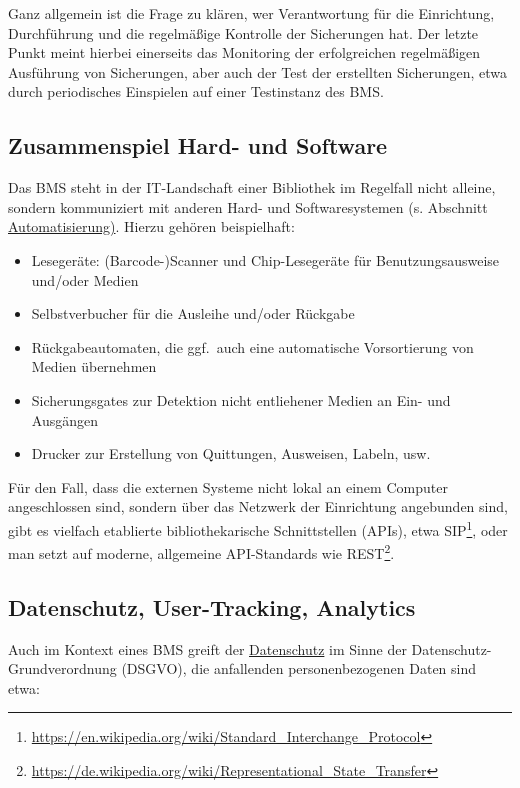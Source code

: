 \documentclass[
  11pt,
  letterpaper,
  DIV=11,
  twoside]{scrreprt}
\DeclareRobustCommand{\href}[2]{#2\footnote{\url{#1}}}
\begin{document}
Ganz allgemein ist die Frage zu klären, wer Verantwortung für die
Einrichtung, Durchführung und die regelmäßige Kontrolle der Sicherungen
hat. Der letzte Punkt meint hierbei einerseits das Monitoring der
erfolgreichen regelmäßigen Ausführung von Sicherungen, aber auch der
Test der erstellten Sicherungen, etwa durch periodisches Einspielen auf
einer Testinstanz des BMS.

\subsection{Zusammenspiel Hard- und
Software}\label{zusammenspiel-hard--und-software}

Das BMS steht in der IT-Landschaft einer Bibliothek im Regelfall nicht
alleine, sondern kommuniziert mit anderen Hard- und Softwaresystemen (s.
Abschnitt
\hyperref[automatisierung-und-selbstbedienung]{Automatisierung)}. Hierzu
gehören beispielhaft:

\begin{itemize}
\item
  Lesegeräte: (Barcode-)Scanner und Chip-Lesegeräte für
  Benutzungsausweise und/oder Medien
\item
  Selbstverbucher für die Ausleihe und/oder Rückgabe
\item
  Rückgabeautomaten, die ggf.~auch eine automatische Vorsortierung von
  Medien übernehmen
\item
  Sicherungsgates zur Detektion nicht entliehener Medien an Ein- und
  Ausgängen
\item
  Drucker zur Erstellung von Quittungen, Ausweisen, Labeln, usw.
\end{itemize}

Für den Fall, dass die externen Systeme nicht lokal an einem Computer
angeschlossen sind, sondern über das Netzwerk der Einrichtung angebunden
sind, gibt es vielfach etablierte bibliothekarische Schnittstellen
(APIs), etwa
\href{https://en.wikipedia.org/wiki/Standard_Interchange_Protocol}{SIP},
oder man setzt auf moderne, allgemeine API-Standards wie
\href{https://de.wikipedia.org/wiki/Representational_State_Transfer}{REST}.

\subsection{Datenschutz, User-Tracking,
Analytics}\label{datenschutz-etc}

Auch im Kontext eines BMS greift der \hyperref[datenschutz]{Datenschutz}
im Sinne der Datenschutz-Grundverordnung (DSGVO), die anfallenden
personenbezogenen Daten sind etwa:
\end{document}
